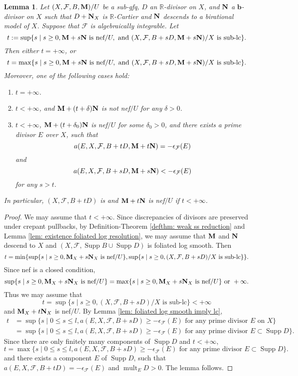 \documentclass[11pt]{amsart}
\newcommand\chen[1]{\todo[color=pink!40]{#1}} %
\numberwithin{equation}{section}
\newcommand{\bb}{\bm{b}}
\newcommand{\Mm}{{\bf{M}}}
\newcommand{\Nn}{{\bf{N}}}
\newcommand{\Rr}{\mathbb{R}}
\newcommand{\Supp}{\operatorname{Supp}}
\newcommand{\mult}{\operatorname{mult}}
\newcommand{\Ff}{\mathcal{F}}
\newtheorem{lem}[thm]{Lemma}
\theoremstyle{definition}
\theoremstyle{definition}
\theoremstyle{definition}
\begin{document}
\begin{lem}\label{lem: alg int foliation lct achieved}
Let $(X,\Ff,B,\Mm)/U$ be a sub-gfq, $D$ an $\Rr$-divisor on $X$, and $\Nn$ a $\bb$-divisor on $X$ such that $D+\Nn_X$ is $\Rr$-Cartier and $\Nn$ descends to a birational model of $X$. Suppose that $\Ff$ is algebraically integrable. Let
$$t:=\sup\{s\mid s\geq 0, \Mm+s\Nn\text{ is nef}/U,\text{ and } (X,\Ff,B+sD,\Mm+s\Nn)/X\text{ is sub-lc}\}.$$
Then either $t=+\infty$, or 
$$t=\max\{s\mid s\geq 0, \Mm+s\Nn\text{ is nef}/U,\text{ and } (X,\Ff,B+sD,\Mm+s\Nn)/X\text{ is sub-lc}\}.$$
Moreover, one of the following cases hold:
\begin{enumerate}
    \item $t=+\infty$.
    \item $t<+\infty$, and $\Mm+(t+\delta)\Nn$ is not nef$/U$ for any $\delta>0$.
    \item $t<+\infty$, $\Mm+(t+\delta_0)\Nn$ is nef$/U$ for some $\delta_0>0$, and there exists a prime divisor $E$ over $X$, such that
    $$a(E,X,\Ff,B+tD,\Mm+t\Nn)=-\epsilon_{\Ff}(E)$$
    and
    $$a(E,X,\Ff,B+sD,\Mm+s\Nn)<-\epsilon_{\Ff}(E)$$
    for any $s>t$.
\end{enumerate}


In particular, $(X,\Ff,B+tD)$ is  and $\Mm+t\Nn$ is nef$/U$ if $t<+\infty$.
\end{lem}
\begin{proof}
We may assume that $t<+\infty$. Since discrepancies of divisors are preserved under crepant pullbacks, by Definition-Theorem \ref{defthm: weak ss reduction} and Lemma \ref{lem: existence foliated log resolution}, we may assume that $\Mm$ and $\Nn$ descend to $X$ and $(X,\Ff,\Supp B\cup\Supp D)$ is foliated log smooth. Then
$$t=\min\{\sup\{s\mid s\geq 0, \Mm_X+s\Nn_X\text{ is nef}/U\},\sup\{s\mid s\geq 0, (X,\Ff,B+sD)/X\text{ is sub-lc}\}\}.$$
Since nef is a closed condition, 
$$\sup\{s\mid s\geq 0, \Mm_X+s\Nn_X\text{ is nef}/U\}=\max\{s\mid s\geq 0, \Mm_X+s\Nn_X\text{ is nef}/U\}\text{ or }+\infty.$$
Thus we may assume that 
$$t=\sup\{s\mid s\geq 0, (X,\Ff,B+sD)/X\text{ is sub-lc}\}<+\infty$$ 
and $\Mm_X+t\Nn_X$ is nef$/U$. By Lemma \ref{lem: foliated log smooth imply lc},
\begin{align*}
    t&=\sup\{s\mid 0\leq s\leq l, a(E,X,\Ff,B+sD)\geq-\epsilon_{\Ff}(E)\text{ for any prime divisor } E\text{ on }X\}\\
    &=\sup\{s\mid 0\leq s\leq l, a(E,X,\Ff,B+sD)\geq-\epsilon_{\Ff}(E)\text{ for any prime divisor } E\subset\Supp D\}.
\end{align*}%
Since there are only finitely many components of $\Supp D$ and $t<+\infty$, 
$$t=\max\{s\mid 0\leq s\leq l, a(E,X,\Ff,B+sD)\geq-\epsilon_{\Ff}(E)\text{ for any prime divisor } E\subset\Supp D\}.$$
and there exists a component $E$ of $\Supp D$, such that $a(E,X,\Ff,B+tD)=-\epsilon_{\Ff}(E)$ and $\mult_ED>0$. The lemma follows.
\end{proof}
\end{document}

